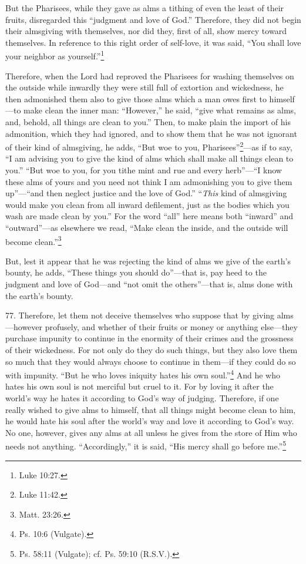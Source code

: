 But the Pharisees, while they gave as alms a tithing of even the least of their fruits, disregarded this ``judgment and love of God.'' Therefore, they did not begin their almsgiving with themselves, nor did they, first of all, show mercy toward themselves. In reference to this right order of self-love, it was said, ``You shall love your neighbor as yourself.''\footnote{Luke 10:27.}

Therefore, when the Lord had reproved the Pharisees for washing themselves on the outside while inwardly they were still full of extortion and wickedness, he then admonished them also to give those alms which a man owes first to himself—to make clean the inner man: ``However,'' he said, ``give what remains as alms, and, behold, all things are clean to you.'' Then, to make plain the import of his admonition, which they had ignored, and to show them that he was not ignorant of their kind of almsgiving, he adds, ``But woe to you, Pharisees''\footnote{Luke 11:42.}—as if to say, ``I am advising you to give the kind of alms which shall make all things clean to you.'' ``But woe to you, for you tithe mint and rue and every herb''—``I know these alms of yours and you need not think I am admonishing you to give them up''—``and then neglect justice and the love of God.'' ``\emph{This} kind of almsgiving would make you clean from all inward defilement, just as the bodies which you wash are made clean by you.'' For the word ``all'' here means both ``inward'' and ``outward''—as elsewhere we read, ``Make clean the inside, and the outside will become clean.''\footnote{Matt. 23:26.}

But, lest it appear that he was rejecting the kind of alms we give of the earth's bounty, he adds, ``These things you should do''—that is, pay heed to the judgment and love of God—and ``not omit the others''—that is, alms done with the earth's bounty.

77. Therefore, let them not deceive themselves who suppose that by giving alms—however profusely, and whether of their fruits or money or anything else—they purchase impunity to continue in the enormity of their crimes and the grossness of their wickedness. For not only do they do such things, but they also love them so much that they would always choose to continue in them—if they could do so with impunity. ``But he who loves iniquity hates his own soul.''\footnote{Ps. 10:6 (Vulgate).} And he who hates his own soul is not merciful but cruel to it. For by loving it after the world's way he hates it according to God's way of judging. Therefore, if one really wished to give alms to himself, that all things might become clean to him, he would hate his soul after the world's way and love it according to God's way. No one, however, gives any alms at all unless he gives from the store of Him who needs not anything. ``Accordingly,'' it is said, ``His mercy shall go before me.''\footnote{Ps. 58:11 (Vulgate); cf. Ps. 59:10 (R.S.V.).}

